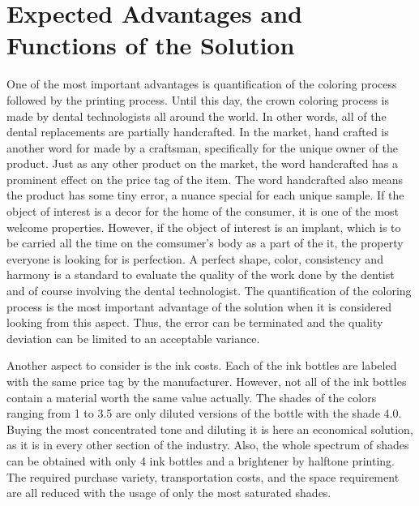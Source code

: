  

\chapter{Expected Advantages and Functions of the Solution}
One of the most important advantages is quantification of the coloring process followed by the printing process. Until this day, the crown coloring process is made by dental technologists all around the world. In other words, all of the dental replacements are partially handcrafted. In the market, hand crafted is another word for made by a craftsman, specifically for the unique owner of the product. Just as any other product on the market, the word handcrafted has a prominent effect on the price tag of the item. The word handcrafted also means the product has some tiny error, a nuance special for each unique sample. If the object of interest is a decor for the home of the consumer, it is one of the most welcome properties. However, if the object of interest is an implant, which is to be carried all the time on the comsumer's body as a part of the it, the property everyone is looking for is perfection. A perfect shape, color, consistency and harmony is a standard to evaluate the quality of the work done by the dentist and of course involving the dental technologist. The quantification of the coloring process is the most important advantage of the solution when it is considered looking from this aspect. Thus, the error can be terminated and the quality deviation can be limited to an acceptable variance. 

Another aspect to consider is the ink costs. Each of the ink bottles are labeled with the same price tag by the manufacturer. However, not all of the ink bottles contain a material worth the same value actually. The shades of the colors ranging from 1 to 3.5 are only diluted versions of the bottle with the shade 4.0. Buying the most concentrated tone and diluting it is here an economical solution, as it is in every other section of the industry. Also, the whole spectrum of shades can be obtained with only 4 ink bottles and a brightener by halftone printing. The required purchase variety, transportation costs, and the space requirement are all reduced with the usage of only the most saturated shades.

